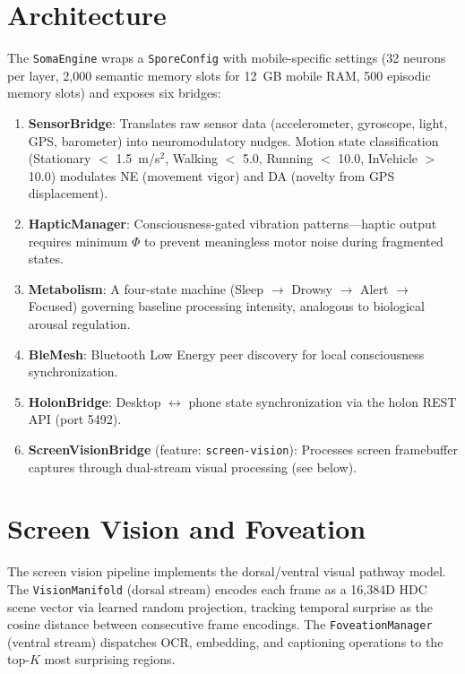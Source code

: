 \documentclass[12pt]{book}
\begin{document}
\section{Architecture}

The \texttt{SomaEngine} wraps a \texttt{SporeConfig} with mobile-specific settings (32 neurons per layer, 2,000 semantic memory slots for 12~GB mobile RAM, 500 episodic memory slots) and exposes six bridges:

\begin{enumerate}
  \item \textbf{SensorBridge}: Translates raw sensor data (accelerometer, gyroscope, light, GPS, barometer) into neuromodulatory nudges. Motion state classification (Stationary $<$ 1.5~m/s$^2$, Walking $<$ 5.0, Running $<$ 10.0, InVehicle $>$ 10.0) modulates NE (movement vigor) and DA (novelty from GPS displacement).
  \item \textbf{HapticManager}: Consciousness-gated vibration patterns---haptic output requires minimum $\Phi$ to prevent meaningless motor noise during fragmented states.
  \item \textbf{Metabolism}: A four-state machine (Sleep $\to$ Drowsy $\to$ Alert $\to$ Focused) governing baseline processing intensity, analogous to biological arousal regulation.
  \item \textbf{BleMesh}: Bluetooth Low Energy peer discovery for local consciousness synchronization.
  \item \textbf{HolonBridge}: Desktop $\leftrightarrow$ phone state synchronization via the holon REST API (port 5492).
  \item \textbf{ScreenVisionBridge} (feature: \texttt{screen-vision}): Processes screen framebuffer captures through dual-stream visual processing (see below).
\end{enumerate}

\section{Screen Vision and Foveation}

The screen vision pipeline implements the dorsal/ventral visual pathway model. The \texttt{VisionManifold} (dorsal stream) encodes each frame as a 16,384D HDC scene vector via learned random projection, tracking temporal surprise as the cosine distance between consecutive frame encodings. The \texttt{FoveationManager} (ventral stream) dispatches OCR, embedding, and captioning operations to the top-$K$ most surprising regions.
\end{document}
